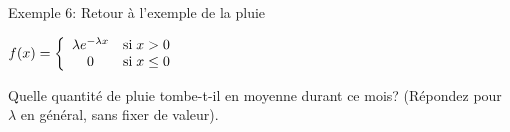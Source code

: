 \documentclass[handout]{BeamerTemplate}
\begin{document}
%
%

\begin{frame}[t]{Exemple 6: Retour à l'exemple de la pluie}

 {\small $f(x)=\left\{\begin{array}{c l}\lambda e^{-\lambda x}&\text{si} \;x>0\\
 0&\text{si} \; x\leq 0
 \end{array}\right.$

\vspace{3mm}

Quelle quantité de pluie tombe-t-il en moyenne durant ce mois? (Répondez pour $\lambda$ en général, sans fixer de valeur).
}




\end{frame}







\end{document}

